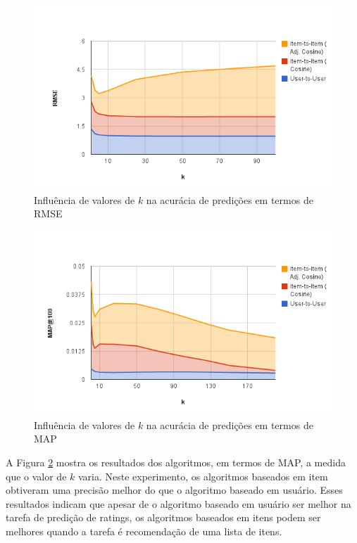 \documentclass[12pt, a4paper, oneside]{article}
\begin{document}
\begin{figure}[!ht]
\centering
\includegraphics[scale=.45]{img/rmse.png} 
\caption{Influência de valores de $k$ na acurácia de predições em termos de RMSE}
\label{fig:rmse}
\end{figure}

\begin{figure}[!ht]
\centering
\includegraphics[scale=.45]{img/map.png} 
\caption{Influência de valores de $k$ na acurácia de predições em termos de MAP}
\label{fig:map}
\end{figure}

A Figura \ref{fig:map} mostra os resultados dos algoritmos, em termos de MAP, a medida que o valor de $k$ varia. Neste experimento, os algoritmos baseados em item obtiveram uma precisão melhor do que o algoritmo baseado em usuário. Esses resultados indicam que apesar de o algoritmo baseado em usuário ser melhor na tarefa de predição de ratings, os algoritmos baseados em itens podem ser melhores quando a tarefa é recomendação de uma lista de itens.
\end{document}
